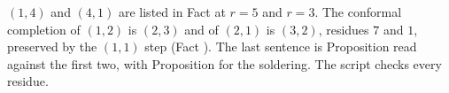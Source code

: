 $(1,4)$ and $(4,1)$ are listed in Fact  at $r = 5$ and $r = 3$. The conformal completion of $(1,2)$ is $(2,3)$ and of $(2,1)$ is $(3,2)$, residues $7$ and $1$, preserved by the $(1,1)$ step (Fact ). The last sentence is Proposition  read against the first two, with Proposition  for the soldering. The script checks every residue.
